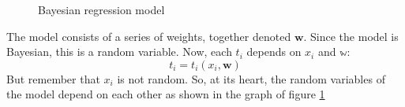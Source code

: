 \documentclass[12pt, a4paper]{article}
\numberwithin{equation}{section}
\begin{document}
\begin{figure}
\centering
{}
\caption{Bayesian regression model}
\label{graph:bayesian_regression}
\end{figure}

The model consists of a series of weights, together denoted $\mathbf{w}$. Since the model is Bayesian, this is a random variable. Now, each $t_i$ depends on $x_i$ and $\mathbb{w}$:
\begin{equation}
t_i=t_i(x_i,\mathbf{w})
\end{equation}
But remember that $x_i$ is not random. So, at its heart, the random variables of the model depend on each other as shown in the graph of figure \ref{graph:bayesian_regression}
\end{document}
